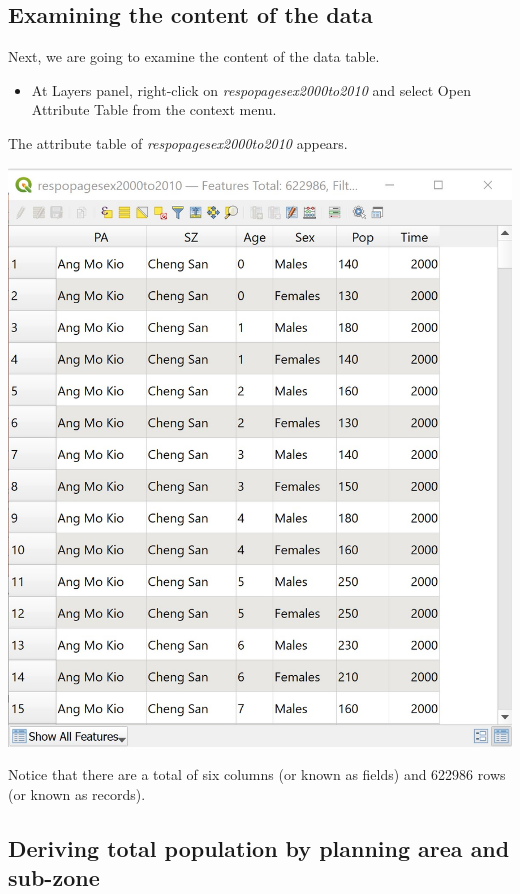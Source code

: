 \documentclass[
  letterpaper,
  DIV=11,
  numbers=noendperiod]{scrreprt}
\providecommand{\tightlist}{%
  \setlength{\itemsep}{0pt}\setlength{\parskip}{0pt}}\usepackage{longtable,booktabs,array}
\begin{document}
\hypertarget{examining-the-content-of-the-data}{%
\subsection{Examining the content of the
data}\label{examining-the-content-of-the-data}}

Next, we are going to examine the content of the data table.

\begin{itemize}
\tightlist
\item
  At Layers panel, right-click on \emph{respopagesex2000to2010} and
  select Open Attribute Table from the context menu.
\end{itemize}

The attribute table of \emph{respopagesex2000to2010} appears.

\includegraphics{./img03/image40.jpg}

Notice that there are a total of six columns (or known as fields) and
622986 rows (or known as records).

\hypertarget{deriving-total-population-by-planning-area-and-sub-zone}{%
\subsection{Deriving total population by planning area and
sub-zone}\label{deriving-total-population-by-planning-area-and-sub-zone}}
\end{document}
